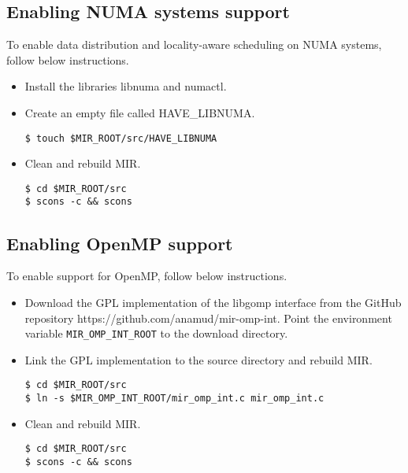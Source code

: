 \documentclass[11pt,a4paper]{article}
\begin{document}
\subsection{Enabling NUMA systems support}\label{sec:enabling-numa-systems-support}

To enable data distribution and locality-aware scheduling on NUMA systems, follow below instructions.

\begin{itemize}
    \item Install the libraries libnuma and numactl.
    \item Create an empty file called \textsf{HAVE\_LIBNUMA}.

\begin{lstlisting}[style=MyInputStyle]
$ touch $MIR_ROOT/src/HAVE_LIBNUMA
\end{lstlisting}

    \item Clean and rebuild MIR.

\begin{lstlisting}[style=MyInputStyle]
$ cd $MIR_ROOT/src
$ scons -c && scons
\end{lstlisting}
\end{itemize}

\subsection{Enabling OpenMP support}\label{sec:enable-omp-support}

To enable support for OpenMP, follow below instructions.

\begin{itemize}
    \item Download the GPL implementation of the libgomp interface from the GitHub repository \textsf{https://github.com/anamud/mir-omp-int}.  Point the environment variable \texttt{MIR\_OMP\_INT\_ROOT} to the download directory.

    \item Link the GPL implementation to the source directory and rebuild MIR.

\begin{lstlisting}[style=MyInputStyle]
$ cd $MIR_ROOT/src
$ ln -s $MIR_OMP_INT_ROOT/mir_omp_int.c mir_omp_int.c
\end{lstlisting}

    \item Clean and rebuild MIR.

\begin{lstlisting}[style=MyInputStyle]
$ cd $MIR_ROOT/src
$ scons -c && scons
\end{lstlisting}
\end{itemize}
\end{document}
